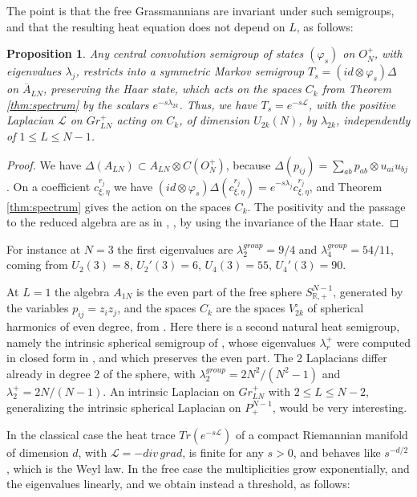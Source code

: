 \documentclass[11pt]{article}
\theoremstyle{plain}
\newtheorem{proposition}[theorem]{Proposition}
\begin{document}
The point is that the free Grassmannians are invariant under such semigroups, and that the resulting heat equation does not depend on $L$, as follows:

\begin{proposition}
\label{prop:central}
Any central convolution semigroup of states $(\varphi_s)$ on $O_N^+$, with eigenvalues $\lambda_j$, restricts into a symmetric Markov semigroup $T_s=(id\otimes\varphi_s)\Delta$ on $\overline{A}_{LN}$, preserving the Haar state, which acts on the spaces $C_k$ from Theorem \ref{thm:spectrum} by the scalars $e^{-s\lambda_{2k}}$. Thus, we have $T_s=e^{-s\mathcal L}$, with the positive Laplacian $\mathcal L$ on $Gr^+_{LN}$ acting on $C_k$, of dimension $U_{2k}(N)$, by $\lambda_{2k}$, independently of $1\leq L\leq N-1$.
\end{proposition}

\begin{proof}
We have $\Delta(A_{LN})\subset A_{LN}\otimes C(O_N^+)$, because $\Delta(p_{ij})=\sum_{ab}p_{ab}\otimes u_{ai}u_{bj}$. On a coefficient $c^{r_j}_{\xi,\eta}$ we have $(id\otimes\varphi_s)\Delta(c^{r_j}_{\xi,\eta})=e^{-s\lambda_j}c^{r_j}_{\xi,\eta}$, and Theorem \ref{thm:spectrum} gives the action on the spaces $C_k$. The positivity and the passage to the reduced algebra are as in \cite{mfs}, \cite{dfw}, by using the invariance of the Haar state.
\end{proof}

For instance at $N=3$ the first eigenvalues are $\lambda_2^{group}=9/4$ and $\lambda_4^{group}=54/11$, coming from $U_2(3)=8$, $U_2'(3)=6$, $U_4(3)=55$, $U_4'(3)=90$.

\bigskip

At $L=1$ the algebra $A_{1N}$ is the even part of the free sphere $S^{N-1}_{\mathbb R,+}$, generated by the variables $p_{ij}=z_iz_j$, and the spaces $C_k$ are the spaces $V_{2k}^\circ$ of spherical harmonics of even degree, from \cite{mfs}. Here there is a second natural heat semigroup, namely the intrinsic spherical semigroup of \cite{dfw}, whose eigenvalues $\lambda_r^+$ were computed in closed form in \cite{mfs}, and which preserves the even part. The 2 Laplacians differ already in degree 2 of the sphere, with $\lambda_2^{group}=2N^2/(N^2-1)$ and $\lambda_2^+=2N/(N-1)$. An intrinsic Laplacian on $Gr^+_{LN}$ with $2\leq L\leq N-2$, generalizing the intrinsic spherical Laplacian on $P^{N-1}_+$, would be very interesting.

\bigskip

In the classical case the heat trace $Tr(e^{-s\mathcal L})$ of a compact Riemannian manifold of dimension $d$, with $\mathcal L=-div\,grad$, is finite for any $s>0$, and behaves like $s^{-d/2}$, which is the Weyl law. In the free case the multiplicities grow exponentially, and the eigenvalues linearly, and we obtain instead a threshold, as follows:
\end{document}
